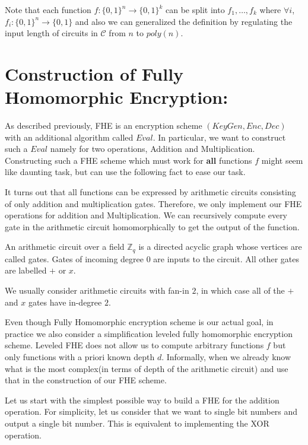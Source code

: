\documentclass[usletter]{article}
\begin{document}
Note that each function $f:\{0,1\}^n\rightarrow\{0,1\}^k$ can be split into $f_1,\dots,f_k$ where $\forall i$, $f_i:\{0,1\}^n\rightarrow\{0,1\}$ and also we can generalized the definition by regulating the input length of circuits in $\mathcal{C}$ from $n$ to $poly(n)$.

\section{Construction of Fully Homomorphic Encryption:}
As described previously, FHE is an encryption scheme $(KeyGen, Enc, Dec)$ 
with an additional algorithm called $Eval$. In particular, we want to construct 
such a $Eval$ namely for two operations, Addition and Multiplication. Constructing 
such a FHE scheme which must work for \textbf{all} functions $f$ might seem like daunting task, 
but can use the following fact to ease our task.
\begin{fact}
It turns out that all functions can be expressed by arithmetic circuits consisting
of only addition and multiplication gates. Therefore, we only implement our FHE operations for 
addition and Multiplication. We can recursively compute every gate  in the arithmetic circuit 
homomorphically to get the output of the function. 
\end{fact}

\begin{definition}
An arithmetic circuit over a field $\mathbb{Z}_q$ is a directed
acyclic graph whose vertices are called gates. Gates of incoming degree $0$ are inputs to
the circuit. All other gates are labelled $+$ or $x$. 
\end{definition}
We usually consider arithmetic circuits with fan-in $2$, in which 
case all of the $+$ and $x$ gates have in-degree $2$.

\begin{remark}
Even though Fully Homomorphic encryption scheme is our actual goal, in practice we also consider 
a simplification leveled fully homomorphic encryption scheme. Leveled FHE does not allow us to 
compute arbitrary functions $f$ but only functions with a priori known depth $d$. Informally, when 
we already know what is the most complex(in terms of depth of the arithmetic circuit) and use that 
in the construction of our FHE scheme.
\end{remark}

Let us start with the simplest possible way to build a FHE for the addition operation. 
For simplicity, let us consider that we want to single bit numbers 
and output a single bit number. This is equivalent to implementing the XOR operation. 
\end{document}
